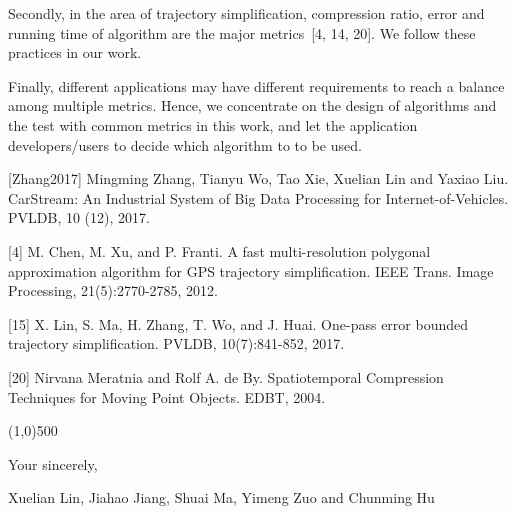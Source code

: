 \documentclass{letter}
\newcommand{\eg}{\emph{e.g.,}\xspace}
\begin{document}
Secondly, in the area of trajectory simplification, compression ratio, error and running time of algorithm are the major metrics~[4, 14, 20]. We follow these practices in our work.


Finally, different applications may have different requirements to reach a balance among multiple metrics. Hence, we concentrate on the design of algorithms and the test with common metrics in this work, and let the application developers/users to decide which algorithm to to be used.

[Zhang2017] Mingming Zhang, Tianyu Wo, Tao Xie, Xuelian Lin and Yaxiao Liu. CarStream: An Industrial System of Big Data Processing for Internet-of-Vehicles. PVLDB, 10 (12), 2017.

[4] M. Chen, M. Xu, and P. Franti. A fast multi-resolution polygonal approximation algorithm for GPS trajectory
simplification. IEEE Trans. Image Processing, 21(5):2770-2785, 2012.

[15] X. Lin, S. Ma, H. Zhang, T. Wo, and J. Huai. One-pass error bounded trajectory simplification. PVLDB, 10(7):841-852, 2017.

[20] Nirvana Meratnia and Rolf A. de By. Spatiotemporal Compression Techniques for Moving Point Objects. EDBT, 2004.


\line(1,0){500}



Your sincerely,

Xuelian Lin, Jiahao Jiang, Shuai Ma, Yimeng Zuo and Chunming Hu



%
%
\end{document}
